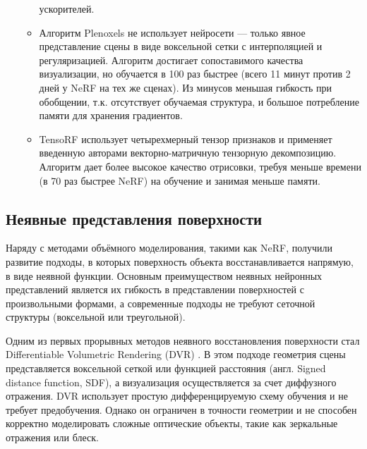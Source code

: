 \begin{itemize}
\begin{itemize}
		ускорителей.
		\item Алгоритм Plenoxels \cite{yu2021plenoxelsradiancefieldsneural} не использует
		нейросети — только явное представление сцены в виде воксельной сетки с
		интерполяцией и регуляризацией. Алгоритм достигает сопоставимого качества
		визуализации, но обучается в 100 раз быстрее (всего 11 минут против 2 дней у
		NeRF на тех же сценах). Из минусов меньшая гибкость при обобщении, т.к.
		отсутствует обучаемая структура, и большое потребление памяти для
		хранения градиентов.
		\item TensoRF \cite{chen2022tensorftensorialradiancefields} использует
		четырехмерный тензор признаков и применяет введенную авторами
		векторно-матричную тензорную декомпозицию. Алгоритм дает более высокое качество отрисовки,
		требуя меньше времени (в 70 раз быстрее NeRF) на обучение и занимая меньше памяти.
	\end{itemize}
\end{itemize}

\subsection{Неявные представления поверхности}

Наряду с методами объёмного моделирования, такими как NeRF, получили развитие
подходы, в которых поверхность объекта восстанавливается напрямую, в виде
неявной функции. Основным преимуществом неявных нейронных представлений является
их гибкость в представлении поверхностей с произвольными формами,
а современные подходы не требуют сеточной структуры (воксельной или треугольной).

Одним из первых прорывных методов неявного восстановления поверхности стал
Differentiable Volumetric Rendering (DVR)
\cite{niemeyer2020differentiablevolumetricrenderinglearning}. В этом подходе
геометрия сцены представляется воксельной сеткой или функцией расстояния (англ.
Signed distance function, SDF), а визуализация осуществляется за счет диффузного
отражения. DVR использует простую дифференцируемую схему обучения и не требует
предобучения.  Однако он ограничен в точности геометрии и не способен корректно
моделировать сложные оптические объекты, такие как зеркальные отражения или блеск.

